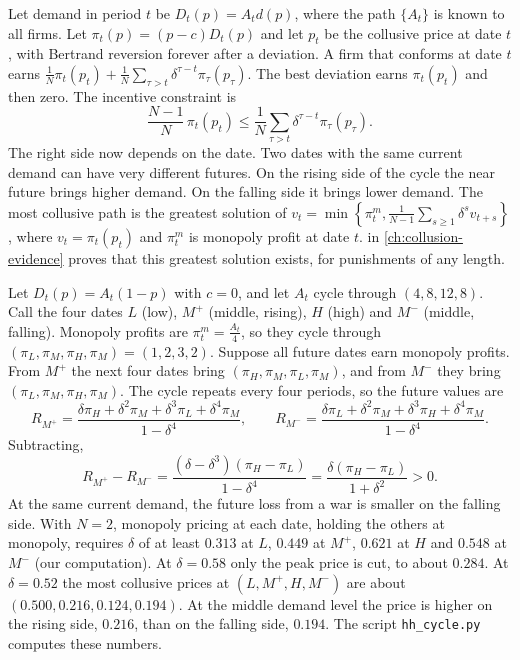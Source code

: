 Let demand in period $t$ be $D_t(p) = A_t d(p)$, where the path $\{A_t\}$ is known to all firms. Let $\pi_t(p) =
(p-c)D_t(p)$ and let $p_t$ be the collusive price at date $t$, with Bertrand reversion forever after a deviation. A
firm that conforms at date $t$ earns $\frac{1}{N}\pi_t(p_t) + \frac{1}{N}\sum_{\tau > t}\delta^{\tau - t}\pi_\tau(p_\tau)$. The best
deviation earns $\pi_t(p_t)$ and then zero. The incentive constraint is
\begin{equation}\label{eq:12-hh-ic}
\frac{N-1}{N}\,\pi_t(p_t) \le \frac{1}{N}\sum_{\tau > t}\delta^{\tau - t}\pi_\tau(p_\tau).
\end{equation}
The right side now depends on the date. Two dates with the same current demand can have very different futures. On
the rising side of the cycle the near future brings higher demand. On the falling side it brings lower demand. The
most collusive path is the greatest solution of $v_t = \min\left\{\pi^m_t, \frac{1}{N-1}\sum_{s \ge 1}\delta^s v_{t+s}\right\}$,
where $v_t = \pi_t(p_t)$ and $\pi^m_t$ is monopoly profit at date $t$.  in
\cref{ch:collusion-evidence} proves that this greatest solution exists, for punishments of any length.

\begin{example}\label{ex:12-hh-cycle}
Let $D_t(p) = A_t(1-p)$ with $c = 0$, and let $A_t$ cycle through $(4, 8, 12, 8)$. Call the four dates $L$ (low), $M^+$
(middle, rising), $H$ (high) and $M^-$ (middle, falling). Monopoly profits are $\pi^m_t = \frac{A_t}{4}$, so they cycle
through $(\pi_L, \pi_M, \pi_H, \pi_M) = (1, 2, 3, 2)$. Suppose all future dates earn monopoly profits. From $M^+$ the next
four dates bring $(\pi_H, \pi_M, \pi_L, \pi_M)$, and from $M^-$ they bring $(\pi_L, \pi_M, \pi_H, \pi_M)$. The cycle repeats every
four periods, so the future values are
\begin{equation*}
R_{M^+} = \frac{\delta\pi_H + \delta^2\pi_M + \delta^3\pi_L + \delta^4\pi_M}{1 - \delta^4}, \qquad
R_{M^-} = \frac{\delta\pi_L + \delta^2\pi_M + \delta^3\pi_H + \delta^4\pi_M}{1 - \delta^4}.
\end{equation*}
Subtracting,
\begin{equation*}
R_{M^+} - R_{M^-} = \frac{(\delta - \delta^3)(\pi_H - \pi_L)}{1 - \delta^4} = \frac{\delta(\pi_H - \pi_L)}{1 + \delta^2} > 0 .
\end{equation*}
At the same current demand, the future loss from a war is smaller on the falling side. With $N = 2$, monopoly pricing
at each date, holding the others at monopoly, requires $\delta$ of at least $0.313$ at $L$, $0.449$ at $M^+$, $0.621$ at $H$
and $0.548$ at $M^-$ (our computation). At $\delta = 0.58$ only the peak price is cut, to about $0.284$. At $\delta = 0.52$
the most collusive prices at $(L, M^+, H, M^-)$ are about $(0.500, 0.216, 0.124, 0.194)$. At the middle demand level the
price is higher on the rising side, $0.216$, than on the falling side, $0.194$. The script \texttt{hh\_cycle.py} computes
these numbers.
\end{example}

